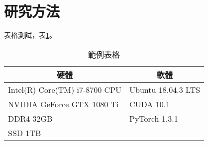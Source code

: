 \section{研究方法}

表格測試，表\ref{table:hardware_software}。

\begin{table}[h]
    \centering
    \caption{範例表格}
    \label{table:hardware_software}
    \begin{tabular}{p{}p{}}
        \hline
        \multicolumn{1}{c}{\textbf{硬體}} & \multicolumn{1}{c}{\textbf{軟體}} \\ \hline
        Intel(R) Core(TM) i7-8700 CPU      & Ubuntu 18.04.3 LTS               \\
        NVIDIA GeForce GTX 1080 Ti         & CUDA 10.1                        \\
        DDR4 32GB                          & PyTorch 1.3.1                    \\
        SSD 1TB                            &                                  \\ \hline
    \end{tabular}
\end{table}